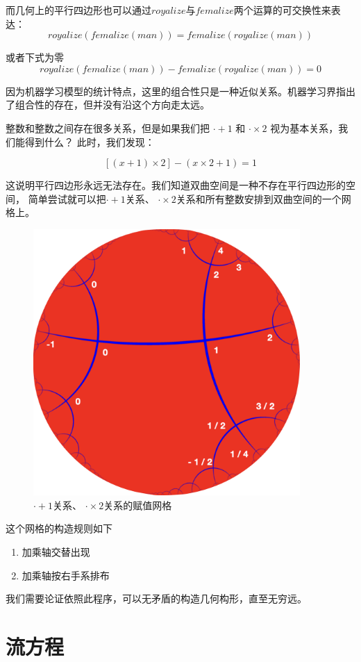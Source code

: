 \documentclass[a4paper,12pt]{article}
\begin{document}
而几何上的平行四边形也可以通过$royalize$与$femalize$两个运算的可交换性来表达：
$$
    royalize(femalize(man)) = femalize(royalize(man))
$$

或者下式为零
$$
    royalize(femalize(man)) - femalize(royalize(man)) = 0
$$

因为机器学习模型的统计特点，这里的组合性只是一种近似关系。机器学习界指出了组合性的存在，但并没有沿这个方向走太远。

整数和整数之间存在很多关系，但是如果我们把 $\cdot + 1$ 和 $\cdot \times 2$ 视为基本关系，我们能得到什么？ 此时，我们发现：

$$
[(x + 1) \times 2] - (x \times 2 + 1) = 1
$$

这说明平行四边形永远无法存在。我们知道双曲空间是一种不存在平行四边形的空间，
简单尝试就可以把$\cdot + 1$关系、 $\cdot \times 2$关系和所有整数安排到双曲空间的一个网格上。

\begin{figure}[ht]
\centering
\includegraphics[width=4in]{images/assignment2.png}
\caption{$\cdot + 1$关系、 $\cdot \times 2$关系的赋值网格}
\end{figure}

这个网格的构造规则如下
\begin{enumerate}
\item 加乘轴交替出现
\item 加乘轴按右手系排布
\end{enumerate}

我们需要论证依照此程序，可以无矛盾的构造几何构形，直至无穷远。


\section{流方程}
\end{document}
